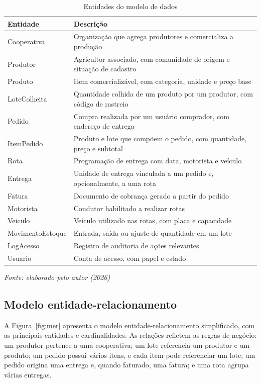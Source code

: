 \begin{table}[H]
  \centering
  \caption{Entidades do modelo de dados}
  \label{tab:entidades}
  \fontsize{9.5}{11.5}\selectfont
  \begin{tabular}{L{3.4cm}L{11.6cm}}
    \toprule
    \textbf{Entidade} & \textbf{Descrição} \\
    \midrule
    Cooperativa & Organização que agrega produtores e comercializa a produção \\
    Produtor & Agricultor associado, com comunidade de origem e situação de
      cadastro \\
    Produto & Item comercializável, com categoria, unidade e preço base \\
    LoteColheita & Quantidade colhida de um produto por um produtor, com código
      de rastreio \\
    Pedido & Compra realizada por um usuário comprador, com endereço de entrega \\
    ItemPedido & Produto e lote que compõem o pedido, com quantidade, preço e
      subtotal \\
    Rota & Programação de entrega com data, motorista e veículo \\
    Entrega & Unidade de entrega vinculada a um pedido e, opcionalmente, a uma
      rota \\
    Fatura & Documento de cobrança gerado a partir do pedido \\
    Motorista & Condutor habilitado a realizar rotas \\
    Veiculo & Veículo utilizado nas rotas, com placa e capacidade \\
    MovimentoEstoque & Entrada, saída ou ajuste de quantidade em um lote \\
    LogAcesso & Registro de auditoria de ações relevantes \\
    Usuario & Conta de acesso, com papel e estado \\
    \bottomrule
  \end{tabular}

  \vspace{2pt}
  {\fontsize{10}{12}\selectfont\itshape Fonte: elaborado pelo autor (2026)}
\end{table}

\subsection{Modelo entidade-relacionamento}

A Figura~\ref{fig:mer} apresenta o modelo entidade-relacionamento simplificado,
com as principais entidades e cardinalidades. As relações refletem as regras de
negócio: um produtor pertence a uma cooperativa; um lote referencia um produtor
e um produto; um pedido possui vários itens, e cada item pode referenciar um
lote; um pedido origina uma entrega e, quando faturado, uma fatura; e uma rota
agrupa várias entregas.

